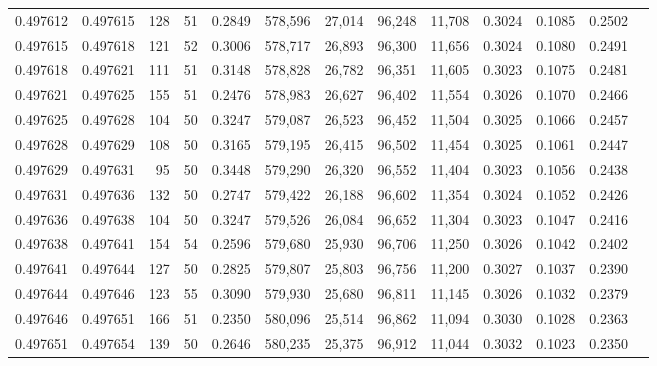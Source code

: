 \begin{tabular}{rrrrrrrrrrrrr}
0.497612 & 0.497615 &   128 &  51 &                                     0.2849 & 578,596 &  27,014 &  96,248 &  11,708 & 0.3024 & 0.1085 & 0.2502 \\
0.497615 & 0.497618 &   121 &  52 &                                     0.3006 & 578,717 &  26,893 &  96,300 &  11,656 & 0.3024 & 0.1080 & 0.2491 \\
0.497618 & 0.497621 &   111 &  51 &                                     0.3148 & 578,828 &  26,782 &  96,351 &  11,605 & 0.3023 & 0.1075 & 0.2481 \\
0.497621 & 0.497625 &   155 &  51 &                                     0.2476 & 578,983 &  26,627 &  96,402 &  11,554 & 0.3026 & 0.1070 & 0.2466 \\
0.497625 & 0.497628 &   104 &  50 &                                     0.3247 & 579,087 &  26,523 &  96,452 &  11,504 & 0.3025 & 0.1066 & 0.2457 \\
0.497628 & 0.497629 &   108 &  50 &                                     0.3165 & 579,195 &  26,415 &  96,502 &  11,454 & 0.3025 & 0.1061 & 0.2447 \\
0.497629 & 0.497631 &    95 &  50 &                                     0.3448 & 579,290 &  26,320 &  96,552 &  11,404 & 0.3023 & 0.1056 & 0.2438 \\
0.497631 & 0.497636 &   132 &  50 &                                     0.2747 & 579,422 &  26,188 &  96,602 &  11,354 & 0.3024 & 0.1052 & 0.2426 \\
0.497636 & 0.497638 &   104 &  50 &                                     0.3247 & 579,526 &  26,084 &  96,652 &  11,304 & 0.3023 & 0.1047 & 0.2416 \\
0.497638 & 0.497641 &   154 &  54 &                                     0.2596 & 579,680 &  25,930 &  96,706 &  11,250 & 0.3026 & 0.1042 & 0.2402 \\
0.497641 & 0.497644 &   127 &  50 &                                     0.2825 & 579,807 &  25,803 &  96,756 &  11,200 & 0.3027 & 0.1037 & 0.2390 \\
0.497644 & 0.497646 &   123 &  55 &                                     0.3090 & 579,930 &  25,680 &  96,811 &  11,145 & 0.3026 & 0.1032 & 0.2379 \\
0.497646 & 0.497651 &   166 &  51 &                                     0.2350 & 580,096 &  25,514 &  96,862 &  11,094 & 0.3030 & 0.1028 & 0.2363 \\
0.497651 & 0.497654 &   139 &  50 &                                     0.2646 & 580,235 &  25,375 &  96,912 &  11,044 & 0.3032 & 0.1023 & 0.2350 \\

\end{tabular}
